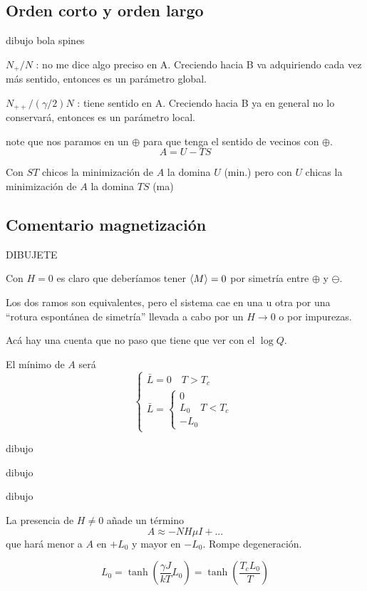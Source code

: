 \documentclass[10pt,oneside]{CBFT_book}
\begin{document}
\subsection{Orden corto y orden largo}

dibujo bola spines

$N_+ / N$ : no me dice algo preciso en A. Creciendo hacia B va adquiriendo cada vez más sentido, entonces
es un parámetro global.

$N_{++}/(\gamma/2)N$ : tiene sentido en A. Creciendo hacia B ya en general no lo conservará, entonces es
un parámetro local.

 note que nos paramos en un $\oplus$ para que tenga el sentido de
vecinos con $\oplus$.
\[
	A = U - TS
\]

Con $ST$ chicos la minimización de $A$ la domina $U$ (min.) pero con $U$ chicas la minimización de $A$ la domina
$TS$ (ma)

\subsection{Comentario magnetización}

DIBUJETE

Con $H=0$ es claro que deberíamos tener $ \braket{M}=0 $ por simetría entre $\oplus$ y $\ominus$.

Los dos ramos son equivalentes, pero el sistema cae en una u otra por una ``rotura espontánea de simetría''
llevada a cabo por un $ H \to 0 $ o por impurezas.

Acá hay una cuenta que no paso que tiene que ver con el $ \log Q $.

El mínimo de $A$ será 
\[ 
	\begin{cases}
		\bar{L} = 0 \quad T > T_c \\
		\bar{L} = \begin{cases}
		0 		  \\
		L_0 \quad T < T_c \\
		-L_0
		\end{cases}
	\end{cases}
\]

dibujo

dibujo

dibujo


La presencia de $ H \neq 0 $ añade un término 
\[
	A \approx - N H \mu I + ...
\]
que hará menor a $ A $ en $ + L_0 $ y mayor en $ - L_0 $. Rompe degeneración.

\[
	L_0 = \tanh\left( \frac{\gamma J}{kT}L_0\right) = \tanh\left( \frac{T_c L_0}{T}\right)
\]
\end{document}
